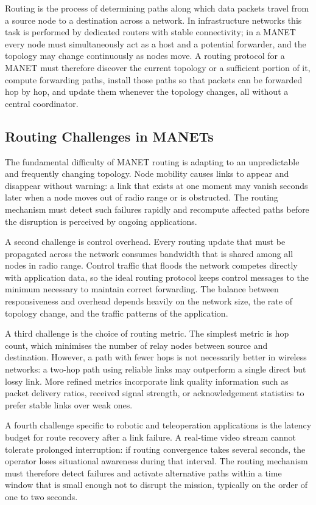 Routing is the process of determining paths along which data packets travel from a source node
to a destination across a network. In infrastructure networks this task is performed by dedicated
routers with stable connectivity; in a MANET every node must simultaneously act as a host and
a potential forwarder, and the topology may change continuously as nodes move. A routing
protocol for a MANET must therefore discover the current topology or a sufficient portion of it,
compute forwarding paths, install those paths so that packets can be forwarded hop by hop, and
update them whenever the topology changes, all without a central coordinator.

\subsection{Routing Challenges in MANETs}

The fundamental difficulty of MANET routing is adapting to an unpredictable and frequently
changing topology. Node mobility causes links to appear and disappear without warning: a link
that exists at one moment may vanish seconds later when a node moves out of radio range or is
obstructed. The routing mechanism must detect such failures rapidly and recompute affected
paths before the disruption is perceived by ongoing applications.

A second challenge is control overhead. Every routing update that must be propagated across
the network consumes bandwidth that is shared among all nodes in radio range. Control traffic
that floods the network competes directly with application data, so the ideal routing protocol
keeps control messages to the minimum necessary to maintain correct forwarding. The balance
between responsiveness and overhead depends heavily on the network size, the rate of topology
change, and the traffic patterns of the application.

A third challenge is the choice of routing metric. The simplest metric is hop count, which
minimises the number of relay nodes between source and destination. However, a path with
fewer hops is not necessarily better in wireless networks: a two-hop path using reliable links
may outperform a single direct but lossy link. More refined metrics incorporate link quality
information such as packet delivery ratios, received signal strength, or acknowledgement
statistics to prefer stable links over weak ones.

A fourth challenge specific to robotic and teleoperation applications is the latency budget for
route recovery after a link failure. A real-time video stream cannot tolerate prolonged
interruption: if routing convergence takes several seconds, the operator loses situational
awareness during that interval. The routing mechanism must therefore detect failures and
activate alternative paths within a time window that is small enough not to disrupt the mission,
typically on the order of one to two seconds.

